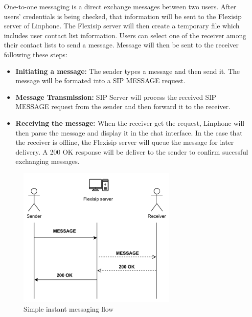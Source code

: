     \noindent One-to-one messaging is a direct exchange messages between two users. 
    After users' credentials is being checked, that information will be sent to the Flexisip server of Linphone. The Flexisip server will then create a temporary file which includes user contact list information.  
    Users can select one of the receiver among their contact lists to send a message. Message will then be sent to the receiver following these steps:

    \begin{itemize}
        \item \textbf {Initiating a message:} The sender types a message and then send it. The message will be formated into a SIP MESSAGE request. 
        \item \textbf {Message Transmission:} SIP Server will process the received SIP MESSAGE request from the sender and then forward it to the receiver. 
        \item \textbf {Receiving the message:} When the receiver get the request, Linphone will then parse the message and display it in the chat interface.
        In the case that the receiver is offline, the Flexisip server will queue the message for later delivery. A 200 OK response will be deliver to the sender to confirm sucessful exchanging messages.
    \end{itemize}

    \begin{figure}[H]
        \centering
        \includegraphics[width=0.7\textwidth]{image/Instant messaging.pdf} 
        \caption{Simple instant messaging flow}
        \label{fig:instant_messaging}
    \end{figure}


    